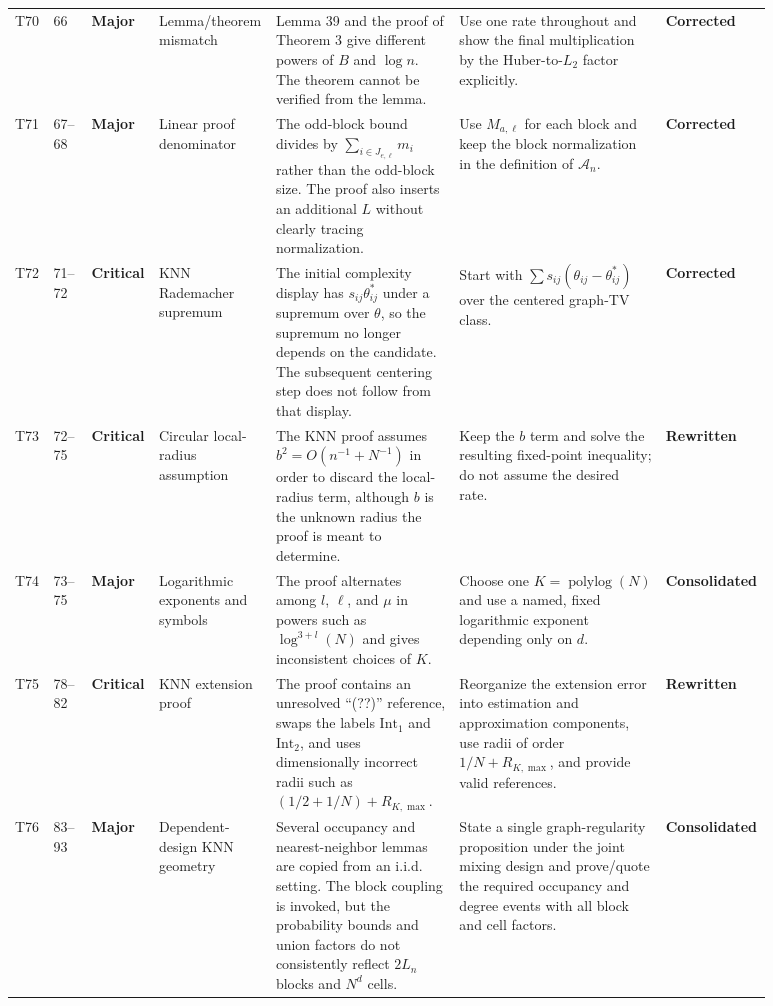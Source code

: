 \documentclass[11pt]{article}
\newcommand{\status}[1]{\textcolor{implgreen}{\textbf{#1}}}
\begin{document}
\begin{landscape}
\begin{longtable}{L{0.04\linewidth}L{0.055\linewidth}L{0.065\linewidth}L{0.11\linewidth}L{0.245\linewidth}L{0.275\linewidth}L{0.095\linewidth}}
T70 & 66 & \textcolor{major}{\textbf{Major}} & Lemma/theorem mismatch & Lemma 39 and the proof of Theorem 3 give different powers of $B$ and $\log n$. The theorem cannot be verified from the lemma. & Use one rate throughout and show the final multiplication by the Huber-to-$L_2$ factor explicitly. & \status{Corrected}\\
T71 & 67--68 & \textcolor{major}{\textbf{Major}} & Linear proof denominator & The odd-block bound divides by $\sum_{i\in J_{e,\ell}}m_i$ rather than the odd-block size. The proof also inserts an additional $L$ without clearly tracing normalization. & Use $M_{a,\ell}$ for each block and keep the block normalization in the definition of $\mathcal A_n$. & \status{Corrected}\\
T72 & 71--72 & \textcolor{crit}{\textbf{Critical}} & KNN Rademacher supremum & The initial complexity display has $s_{ij}\theta^*_{ij}$ under a supremum over $\theta$, so the supremum no longer depends on the candidate. The subsequent centering step does not follow from that display. & Start with $\sum s_{ij}(\theta_{ij}-\theta^*_{ij})$ over the centered graph-TV class. & \status{Corrected}\\
T73 & 72--75 & \textcolor{crit}{\textbf{Critical}} & Circular local-radius assumption & The KNN proof assumes $b^2=O(n^{-1}+N^{-1})$ in order to discard the local-radius term, although $b$ is the unknown radius the proof is meant to determine. & Keep the $b$ term and solve the resulting fixed-point inequality; do not assume the desired rate. & \status{Rewritten}\\
T74 & 73--75 & \textcolor{major}{\textbf{Major}} & Logarithmic exponents and symbols & The proof alternates among $l$, $\ell$, and $\mu$ in powers such as $\log^{3+l}(N)$ and gives inconsistent choices of $K$. & Choose one $K=\operatorname{polylog}(N)$ and use a named, fixed logarithmic exponent depending only on $d$. & \status{Consolidated}\\
T75 & 78--82 & \textcolor{crit}{\textbf{Critical}} & KNN extension proof & The proof contains an unresolved “(??)” reference, swaps the labels $\mathrm{Int}_1$ and $\mathrm{Int}_2$, and uses dimensionally incorrect radii such as $(1/2+1/N)+R_{K,\max}$. & Reorganize the extension error into estimation and approximation components, use radii of order $1/N+R_{K,\max}$, and provide valid references. & \status{Rewritten}\\
T76 & 83--93 & \textcolor{major}{\textbf{Major}} & Dependent-design KNN geometry & Several occupancy and nearest-neighbor lemmas are copied from an i.i.d. setting. The block coupling is invoked, but the probability bounds and union factors do not consistently reflect $2L_n$ blocks and $N^d$ cells. & State a single graph-regularity proposition under the joint mixing design and prove/quote the required occupancy and degree events with all block and cell factors. & \status{Consolidated}\\

\end{longtable}
\end{landscape}
\end{document}
